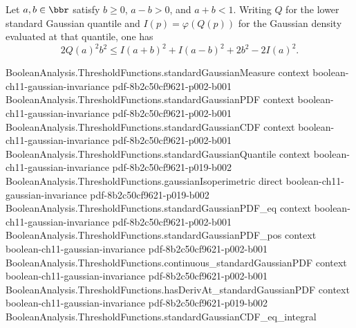\begin{lemma}
\leanok
{}
Let $a,b\in\bbr$ satisfy $b\ge0$, $a-b>0$, and $a+b<1$. Writing $Q$ for the lower
standard Gaussian quantile and $I(p)=\varphi(Q(p))$ for the Gaussian density evaluated
at that quantile, one has
\[
2Q(a)^2b^2\le I(a+b)^2+I(a-b)^2+2b^2-2I(a)^2.
\]
\end{lemma}

\begin{lemma}
\leanok
{}
\proofstep
  {BooleanAnalysis.ThresholdFunctions.standardGaussianMeasure}
  {context}
  {boolean-ch11-gaussian-invariance}
  {pdf-8b2c50cf9621-p002-b001}
\proofstep
  {BooleanAnalysis.ThresholdFunctions.standardGaussianPDF}
  {context}
  {boolean-ch11-gaussian-invariance}
  {pdf-8b2c50cf9621-p002-b001}
\proofstep
  {BooleanAnalysis.ThresholdFunctions.standardGaussianCDF}
  {context}
  {boolean-ch11-gaussian-invariance}
  {pdf-8b2c50cf9621-p002-b001}
\proofstep
  {BooleanAnalysis.ThresholdFunctions.standardGaussianQuantile}
  {context}
  {boolean-ch11-gaussian-invariance}
  {pdf-8b2c50cf9621-p019-b002}
\proofstep
  {BooleanAnalysis.ThresholdFunctions.gaussianIsoperimetric}
  {direct}
  {boolean-ch11-gaussian-invariance}
  {pdf-8b2c50cf9621-p019-b002}
\proofstep
  {BooleanAnalysis.ThresholdFunctions.standardGaussianPDF_eq}
  {context}
  {boolean-ch11-gaussian-invariance}
  {pdf-8b2c50cf9621-p002-b001}
\proofstep
  {BooleanAnalysis.ThresholdFunctions.standardGaussianPDF_pos}
  {context}
  {boolean-ch11-gaussian-invariance}
  {pdf-8b2c50cf9621-p002-b001}
\proofstep
  {BooleanAnalysis.ThresholdFunctions.continuous_standardGaussianPDF}
  {context}
  {boolean-ch11-gaussian-invariance}
  {pdf-8b2c50cf9621-p002-b001}
\proofstep
  {BooleanAnalysis.ThresholdFunctions.hasDerivAt_standardGaussianPDF}
  {context}
  {boolean-ch11-gaussian-invariance}
  {pdf-8b2c50cf9621-p019-b002}
\proofstep
  {BooleanAnalysis.ThresholdFunctions.standardGaussianCDF_eq_integral}

\end{lemma}
